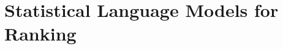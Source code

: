 \documentclass[aspectratio=169]{beamer}
\begin{document}


\section{Statistical Language Models for Ranking}

\begin{frame}[plain]
\sectionpage
\end{frame}
\end{document}
